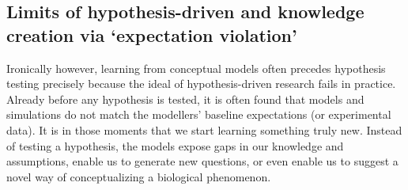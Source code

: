 \subsection{Limits of hypothesis-driven and knowledge creation via `expectation violation'}

Ironically however, learning from conceptual models often precedes hypothesis testing precisely because the  ideal of hypothesis-driven research fails in practice. Already before any hypothesis is tested, it is often found that models and simulations do not match the modellers’ baseline expectations (or experimental data). It is in those moments that we start learning something truly new. Instead of testing a hypothesis, the models expose gaps in our knowledge and assumptions, enable us to generate new questions, or even enable us to suggest a novel way of conceptualizing  a biological phenomenon. 
  
  